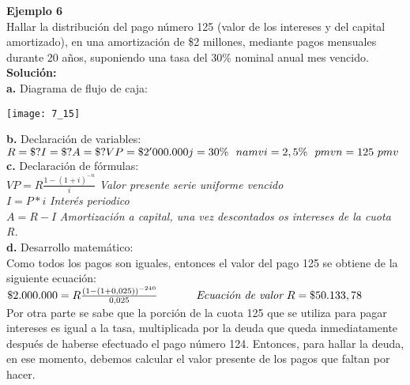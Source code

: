 \textbf{Ejemplo 6 }\\
Hallar la distribución del pago número 125 (valor de los intereses y del capital amortizado), en una amortización de \$2 millones, mediante pagos mensuales durante 20 años, suponiendo una tasa del 30\% nominal anual mes vencido.\\

\textbf{Solución:}\\
\textbf{a.}	Diagrama de flujo de caja:
\begin{center}
	\texttt{[image: 7\_15]}
\end{center}
\textbf{b.}	Declaración de variables:\\


	$R = \$?\\
	I=\$?\\
	A=\$?\\
	VP=\$2'000.000\\
	j=30 \% \ \ namv\\
	i=2,5 \% \ \ pmv\\
	n=125\ pmv$\\

\textbf{c.}	Declaración de fórmulas:\\


	$VP=R \frac{1-(1+i)^{-n}}{i}$ \hspace{35 pt} \textit{Valor presente serie uniforme vencido}\\
	$I=P*i$ \hspace{70 pt} \textit{Interés periodico}\\
	$A=R-I$ \hspace{65 pt} \textit{Amortización a capital, una vez descontados os intereses de la cuota R.}\\
	

\textbf{d.}	Desarrollo matemático:\\

Como todos los pagos son iguales, entonces el valor del pago 125 se obtiene de la siguiente ecuación:\\


	$\$2.000.000=R \frac{(1-(1+0,025))^{-240}}{0,025} \hspace{35 pt} \textit{Ecuación de valor}
	\\ \ R=\$50.133,78$\\
	
	

Por otra parte se sabe que la porción de la cuota 125 que se utiliza para pagar intereses es igual a la tasa, multiplicada por la deuda que queda inmediatamente después de haberse efectuado el pago número 124. Entonces, para hallar la deuda, en ese momento, debemos calcular el valor presente de los pagos que faltan por hacer. \\

